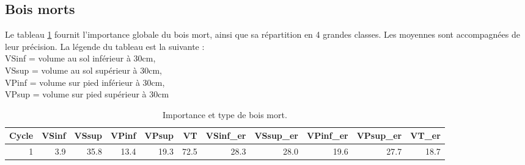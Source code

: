 \documentclass[a4paper]{book}\usepackage[]{graphicx}\usepackage[]{color}
\begin{document}
\subsection{Bois morts}
Le tableau \ref{BoisMort} fournit l'importance globale du bois mort, ainsi que sa répartition en 4 grandes classes. Les moyennes sont accompagnées de leur précision. La légende du tableau est la suivante : \\
VSinf = volume au sol inférieur à 30cm, \\
VSsup = volume au sol supérieur à 30cm, \\
VPinf = volume sur pied inférieur à 30cm, \\
VPsup = volume sur pied supérieur à 30cm \\

\begin{table}[ht]
\centering
{\footnotesize
\begin{tabular}{rrrrrrrrrrr}
  \hline
Cycle & VSinf & VSsup & VPinf & VPsup & VT & VSinf\_er & VSsup\_er & VPinf\_er & VPsup\_er & VT\_er \\ 
  \hline
1 & 3.9 & 35.8 & 13.4 & 19.3 & 72.5 & 28.3 & 28.0 & 19.6 & 27.7 & 18.7 \\ 
   \hline
\end{tabular}
}
\caption{Importance et type de bois mort.} 
\label{BoisMort}
\end{table}
\end{document}
